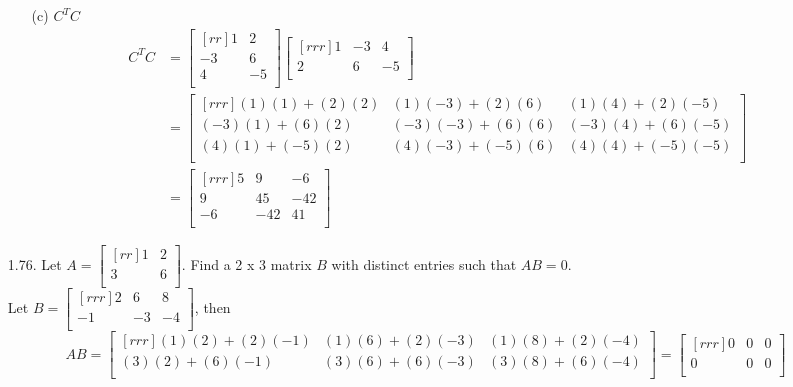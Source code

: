 \documentclass[12pt]{article}
\begin{document}
\begin{enumerate}
\begin{enumerate}
	\item[(c)] $C^T C$
		\begin{align*}
		C^TC 
		&= \begin{bmatrix}[rr] 1 & 2\\ -3 & 6\\ 4 & -5\\ \end{bmatrix}
		\begin{bmatrix}[rrr] 1 & -3 & 4\\ 2 & 6 & -5\\ \end{bmatrix}\\
		&= \begin{bmatrix}[rrr]
		(1)(1)+(2)(2) & (1)(-3)+(2)(6) & (1)(4)+(2)(-5)\\
		(-3)(1)+(6)(2) & (-3)(-3)+(6)(6) & (-3)(4)+(6)(-5)\\
		(4)(1)+(-5)(2) & (4)(-3)+(-5)(6) & (4)(4)+(-5)(-5)\\
		\end{bmatrix}\\
		&= \begin{bmatrix}[rrr] 
		5 & 9 & -6\\ 
		9 & 45 & -42\\ 
		-6 & -42 & 41\\ 
		\end{bmatrix} 				
		\end{align*}
	
	\end{enumerate}
\item[1.76.] Let $A=\begin{bmatrix}[rr] 1 & 2\\ 3 & 6\\ \end{bmatrix}$.
	Find a 2 x 3 matrix $B$ with distinct entries such that $AB = 0$.\\
	Let $B= \begin{bmatrix}[rrr] 2 & 6 & 8\\ -1 & -3 & -4\\ \end{bmatrix}$, then
	\[ AB
	= \begin{bmatrix}[rrr]
	(1)(2)+(2)(-1) & (1)(6)+(2)(-3) & (1)(8)+(2)(-4)\\
	(3)(2)+(6)(-1) & (3)(6)+(6)(-3) & (3)(8)+(6)(-4)\\
	\end{bmatrix}
	= \begin{bmatrix}[rrr]
	0 & 0 & 0\\
	0 & 0 & 0\\
	\end{bmatrix} \]
	

\end{enumerate}
\end{document}
